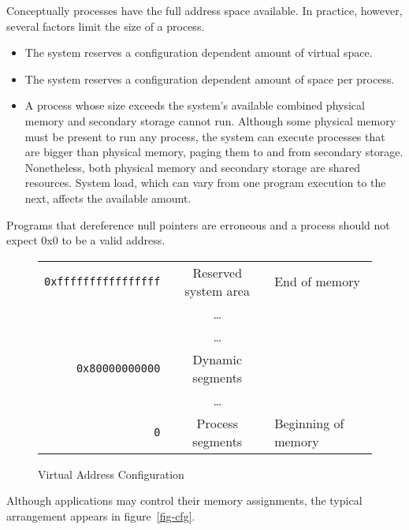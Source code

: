 Conceptually processes have the full address space available.
In practice, however, several factors limit the size of a process.
\begin{itemize}
  \item The system reserves a configuration dependent amount of virtual space.
  \item The system reserves a configuration dependent amount of space per
    process.
  \item
    A process whose size exceeds the system's available combined physical
    memory and secondary storage cannot run. Although some physical memory
    must be present to run any process, the system can execute processes that
    are bigger than physical memory, paging them to and from secondary storage.
    Nonetheless, both physical memory and secondary storage are
    shared resources. System load, which can vary from one program execution
    to the next, affects the available amount.
\end{itemize}

Programs that dereference null pointers are erroneous and a process
should not expect 0x0 to be a valid address.

\begin{figure}[H]
\Hrule
  \caption{Virtual Address Configuration}
  \label{fig-address}
  \begin{center}
    \begin{tabular}{r|c|l}
      \noalign{\smallskip}  \cline{2-2}
      \verb|0xffffffffffffffff| & Reserved system area & End of memory\\
      & \dots & \\ \cline{2-2}
      & \dots & \\
      \verb|0x80000000000| & Dynamic segments & \\ \cline{2-2}
      & \dots & \\
      \verb|0| & Process segments & Beginning of memory\\ \cline{2-2}
    \end{tabular}
  \end{center}
\Hrule
\end{figure}

Although applications may control their memory assignments, the typical
arrangement appears in figure~\ref{fig-cfg}.

